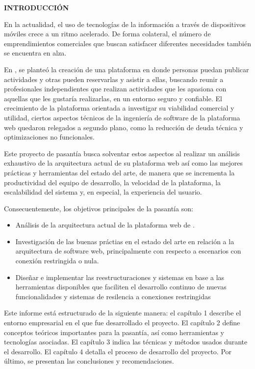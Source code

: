 \begin{center}
\textsc{\bfseries\uppercase{Introducción}}
\end{center}

En la actualidad, el uso de tecnologías de la información a través de dispositivos móviles crece a un ritmo acelerado. De forma colateral, el número de emprendimientos comerciales que buscan satisfacer diferentes necesidades también se encuentra en alza.

En \business, se planteó la creación de una plataforma en donde personas puedan publicar actividades y otras pueden reservarlas y asistir a ellas, buscando reunir a profesionales independientes que realizan actividades que les apasiona con aquellas que les gustaría realizarlas, en un entorno seguro y confiable. El crecimiento de la plataforma orientada a investigar su viabilidad comercial y utilidad, ciertos aspectos técnicos de la ingeniería de software de la plataforma web quedaron relegados a segundo plano, como la reducción de deuda técnica y optimizaciones no funcionales.

Este proyecto de pasantía busca solventar estos aspectos al realizar un análisis exhaustivo de la arquitectura actual de su plataforma web así como las mejores prácticas y herramientas del estado del arte, de manera que se incrementa la productividad del equipo de desarrollo, la velocidad de la plataforma, la escalabilidad del sistema y, en especial, la experiencia del usuario.

Consecuentemente, los objetivos principales de la pasantía son:

\begin{itemize}
  \item Análisis de la arquitectura actual de la plataforma web de \business.
  \item Investigación de las buenas práctias en el estado del arte en relación a la arquitectura de software web, principalmente con respecto a escenarios con conexión restringida o nula.
  \item Diseñar e implementar las reestructuraciones y sistemas en base a las herramientas disponibles que faciliten el desarrollo continuo de nuevas funcionalidades y sistemas de resilencia a conexiones restringidas
\end{itemize}

Este informe está estructurado de la siguiente manera: el capítulo 1 describe el entorno empresarial en el que fue desarrollado el proyecto. El capítulo 2 define conceptos teóricos importantes para la pasantía, así como herramientas y tecnologías asociadas. El capítulo 3 indica las técnicas y métodos usados durante el desarrollo. El capítulo 4 detalla el proceso de desarrollo del proyecto. Por último, se presentan las conclusiones y recomendaciones.
